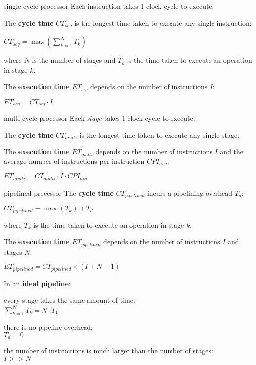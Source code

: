 \begin{defn}{single-cycle processor}
    Each instruction takes 1 clock cycle to execute.

    The \textbf{cycle time} $CT_{seq}$ is the longest time taken to execute any single instruction:

    \( CT_{seq} = \max \left( \sum_{k=1}^{N} T_k \right) \)

    where $N$ is the number of stages and $T_k$ is the time taken to execute an operation in stage $k$.

    The \textbf{execution time} $ET_{seq}$ depends on the number of instructions $I$:
    
    \( ET_{seq} = CT_{seq} \cdot I \)
\end{defn}

\begin{defn}{multi-cycle processor}
    Each \textit{stage} takes 1 clock cycle to execute.

    The \textbf{cycle time} $CT_{multi}$ is the longest time taken to execute any single stage.

    The \textbf{execution time} $ET_{multi}$ depends on the number of instructions $I$ and the average
    number of instructions per instruction $CPI_{avg}$:
    
    \( ET_{multi} = CT_{multi} \cdot I \cdot CPI_{avg} \)
\end{defn}

\begin{defn}{pipelined processor}
    The \textbf{cycle time} $CT_{pipelined}$ incurs a pipelining overhead $T_d$:

    \( CT_{pipelined} = \max \left( T_k \right) + T_d \)

    where $T_k$ is the time taken to execute an operation in stage $k$.

    The \textbf{execution time} $ET_{pipelined}$ depends on the number of instructions $I$ and stages $N$:
    
    \( ET_{pipelined} = CT_{pipelined} \times (I + N - 1) \)
\end{defn}

In an \textbf{ideal pipeline}:
\begin{itemize*}
    \item every stage takes the same amount of time: \\[0.25em] \( \sum_{k=1}^{N} T_k = N \cdot T_1 \)
    \item there is no pipeline overhead: \\[0.25em] \( T_d = 0 \)
    \item the number of instructions is much larger than the number of stages: \\[0.25em] \( I >> N \)
\end{itemize*}

